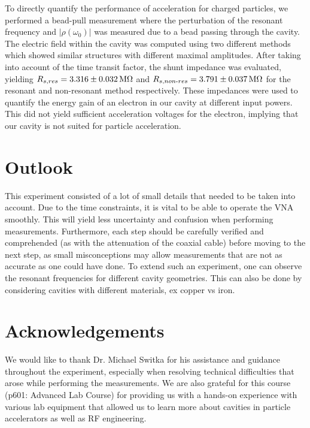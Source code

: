\documentclass[a4paper]{report}
\numberwithin{equation}{section}
\begin{document}
To directly quantify the performance of acceleration for charged particles, we performed a bead-pull measurement where the 
perturbation of the resonant frequency and $|\rho(\omega_0)|$ was measured due to a bead passing through the cavity. The 
electric field within the cavity was computed using two different methods which showed similar structures with different 
maximal amplitudes. After taking into account of the time transit factor, the shunt impedance was evaluated, yielding
$R_{s, res} = \SI{3.316 \pm 0.032}{\mega\ohm}$ and $R_{s, non\text{-}res} = \SI{3.791 \pm 0.037}{\mega\ohm}$ for the 
resonant and non-resonant method respectively. These impedances were used to quantify the energy gain of an electron in our cavity
at different input powers. This did not yield sufficient acceleration voltages for the electron, implying that our cavity is not
suited for particle acceleration. \par 

\section{Outlook}

This experiment consisted of a lot of small details that needed to be taken into account. Due to the time constraints, it is 
vital to be able to operate the VNA smoothly. This will yield less uncertainty and confusion when performing measurements. 
Furthermore, each step should be carefully verified and comprehended (as with the attenuation of the coaxial cable) before
moving to the next step, as small misconceptions may allow measurements that are not as accurate as one could have done. 
To extend such an experiment, one can observe the resonant frequencies for different cavity geometries. This can also be done 
by considering cavities with different materials, ex copper vs iron.

\section*{Acknowledgements}

We would like to thank Dr. Michael Switka for his assistance and guidance throughout the experiment, especially when
resolving technical difficulties that arose while performing the measurements. We are also grateful for this course 
(p601: Advanced Lab Course) for providing us with a hands-on experience with various lab equipment that allowed us to 
learn more about cavities in particle accelerators as well as RF engineering. 
\end{document}
